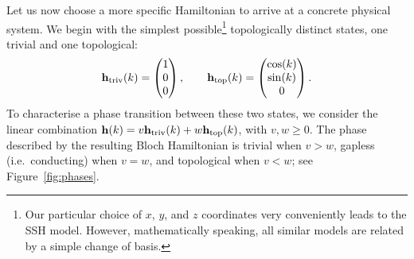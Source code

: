 Let us now choose a more specific Hamiltonian to arrive at a concrete physical system. We begin with the simplest possible\footnote{
	Our particular choice of $x$, $y$, and $z$ coordinates very conveniently leads to the SSH model. However, mathematically speaking, all similar models are related by a simple change of basis.}
topologically distinct states, one trivial and one topological:
\[
	\vb{h}_{\rm triv}(k) = \begin{pmatrix}
		1 \\ 0 \\ 0
	\end{pmatrix},\qquad \vb{h}_{\rm top}(k) = \begin{pmatrix}
		\cos(k) \\ \sin(k) \\ 0
	\end{pmatrix}.
\]
To characterise a phase transition between these two states, we consider the linear combination $\vb{h}(k) = v\vb{h}_{\rm triv}(k) + w\vb{h}_{\rm top}(k)$, with $v,w\geq0$. The phase described by the resulting Bloch Hamiltonian is trivial when $v>w$, gapless (i.e.\ conducting) when $v=w$, and topological when $v<w$; see Figure~\ref{fig:phases}.
